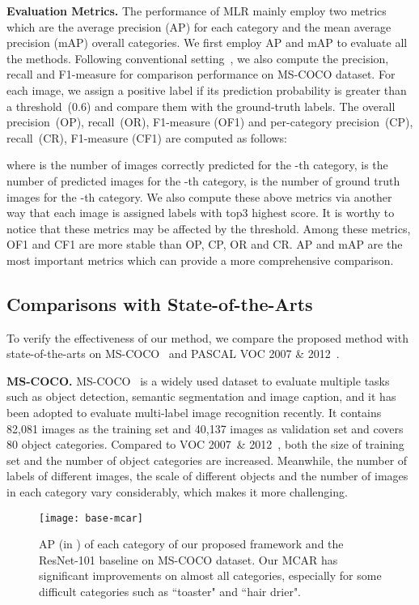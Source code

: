 \documentclass[journal]{IEEEtran}
\begin{document}
\noindent \textbf{Evaluation Metrics.} 
The performance of MLR mainly employ two metrics which are 
the average precision (AP) for each category and the mean average precision (mAP) overall categories. We first employ AP and mAP to evaluate all the methods.  Following conventional setting~\cite{wei2015hcp,chen2019multi,chenlearning},  we also compute the precision, recall and F1-measure for comparison performance on MS-COCO dataset. For each image, we assign a positive label if its prediction probability is greater than a threshold~(0.6) and compare them with the ground-truth labels. The overall precision~(OP), recall~(OR), F1-measure (OF1) and per-category precision~(CP), recall~(CR), F1-measure (CF1) are computed as follows:

  
where  is the number of images correctly predicted for the -th category,   is the number of predicted images for the -th category,  is the number of ground truth images for the -th category. We also compute these above metrics via another way that each image is assigned labels with top3 highest score. It is worthy to notice that these metrics may be affected by the threshold.  Among these metrics, OF1 and CF1 are more stable than OP, CP, OR and CR. AP and mAP are the most important metrics which can provide a more comprehensive comparison.


\subsection{Comparisons with State-of-the-Arts}\label{cstoa}
To verify the effectiveness of our method, we compare the proposed method with state-of-the-arts on MS-COCO~\cite{lin2014microsoft}  and PASCAL VOC 2007 \& 2012~\cite{everingham2010pascal}.

\noindent \textbf{MS-COCO.}
MS-COCO~\cite{lin2014microsoft} is a widely used dataset to evaluate multiple tasks such as object detection, semantic segmentation and image caption, and it has been adopted to evaluate multi-label image recognition recently. 
It contains 82,081 images as the training set and 40,137 images as validation set and covers 80 object categories.
Compared to VOC 2007~\& 2012~\cite{everingham2010pascal}, both the size of training set and the number of object categories are increased. Meanwhile, the number of labels of different images, the scale of different objects and the number of images in each category vary considerably, which makes it more challenging.

 \begin{figure*}[t]
 \centering
   \vspace{0pt}
 {\texttt{[image: base-mcar]}}
  \vspace{0pt}
\caption{AP (in ) of each category of our proposed framework and the ResNet-101 baseline on MS-COCO dataset. Our MCAR has significant improvements on almost all categories, especially for some difficult categories such as ``toaster" and ``hair drier". } \label{fig:cocap}
\end{figure*}
\end{document}
